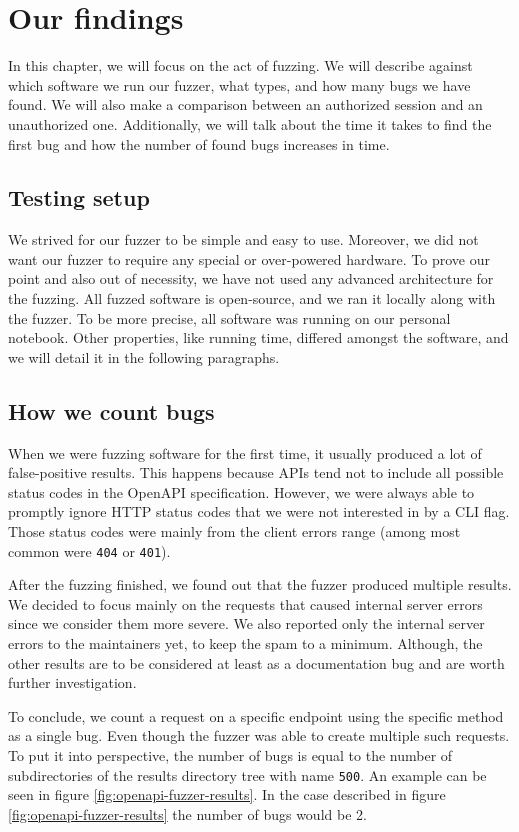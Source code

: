 \chapter{Our findings}
In this chapter, we will focus on the act of fuzzing. We will describe against which software we run our fuzzer, what types, and how many bugs we have found. We will also make a comparison between an authorized session and an unauthorized one. Additionally, we will talk about the time it takes to find the first bug and how the number of found bugs increases in time.

\section{Testing setup}
We strived for our fuzzer to be simple and easy to use. Moreover, we did not want our fuzzer to require any special or over-powered hardware. To prove our point and also out of necessity, we have not used any advanced architecture for the fuzzing. All fuzzed software is open-source, and we ran it locally along with the fuzzer. To be more precise, all software was running on our personal notebook. Other properties, like running time, differed amongst the software, and we will detail it in the following paragraphs.

\section{How we count bugs}
When we were fuzzing software for the first time, it usually produced a lot of false-positive results. This happens because APIs tend not to include all possible status codes in the OpenAPI specification. However, we were always able to promptly ignore HTTP status codes that we were not interested in by a CLI flag. Those status codes were mainly from the client errors range (among most common were \texttt{404} or \texttt{401}).

After the fuzzing finished, we found out that the fuzzer produced multiple results. We decided to focus mainly on the requests that caused internal server errors since we consider them more severe. We also reported only the internal server errors to the maintainers yet, to keep the spam to a minimum. Although, the other results are to be considered at least as a documentation bug and are worth further investigation.

To conclude, we count a request on a specific endpoint using the specific method as a single bug. Even though the fuzzer was able to create multiple such requests. To put it into perspective, the number of bugs is equal to the number of subdirectories of the results directory tree with name \texttt{500}. An example can be seen in figure \ref{fig:openapi-fuzzer-results}. In the case described in figure \ref{fig:openapi-fuzzer-results} the number of bugs would be 2.

